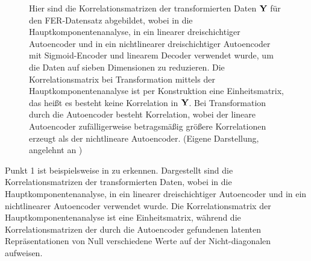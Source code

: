 \begin{figure}[ht]
	\centering
	
	\caption[Korrelationsmatrizen der transformierten Daten $\mat{Y}$ für den FER-Datensatz von vier Methoden]{Hier sind die Korrelationsmatrizen der transformierten Daten $\mat{Y}$ für den FER-Datensatz abgebildet, wobei in \captiona die Hauptkomponentenanalyse, in \captionb ein linearer dreischichtiger Autoencoder und in \captionc ein nichtlinearer dreischichtiger Autoencoder mit Sigmoid-Encoder und linearem Decoder verwendet wurde, um die Daten auf sieben Dimensionen zu reduzieren. Die Korrelationsmatrix bei Transformation mittels der Hauptkomponentenanalyse ist per Konstruktion eine Einheitsmatrix, das heißt es besteht keine Korrelation in $\mat{Y}$. Bei Transformation durch die Autoencoder besteht Korrelation, wobei der lineare Autoencoder zufälligerweise betragsmäßig größere Korrelationen erzeugt als der nichtlineare Autoencoder.  (Eigene Darstellung, angelehnt an \textcite[5]{Plaut.2018})}
	\label{fig:Korrelationsmatrizen}
\end{figure}
Punkt 1 ist beispielsweise in  zu erkennen. Dargestellt sind die Korrelationsmatrizen der transformierten Daten, wobei in \captiona die Hauptkomponentenanalyse, in \captionb ein linearer dreischichtiger Autoencoder und in \captionc ein nichtlinearer Autoencoder verwendet wurde. Die Korrelationsmatrix der Hauptkomponentenanalyse ist eine Einheitsmatrix, während die Korrelationsmatrizen der durch die Autoencoder gefundenen latenten Repräsentationen von Null verschiedene Werte auf der Nicht-diagonalen aufweisen.

